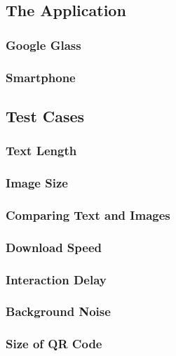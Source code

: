 
\subsection{The Application}

\subsubsection{Google Glass}

\subsubsection{Smartphone}

\subsection{Test Cases}

\subsubsection{Text Length}

\subsubsection{Image Size}

\subsubsection{Comparing Text and Images}

\subsubsection{Download Speed}

\subsubsection{Interaction Delay}

\subsubsection{Background Noise}

\subsubsection{Size of QR Code}

